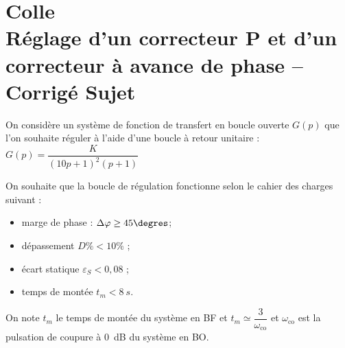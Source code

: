 \chapter*{Colle  \\ 
Réglage d'un correcteur P et d'un correcteur à avance de phase -- 
\ifprof Corrigé \else Sujet \fi}

\iflivret {} \else
\ifprof  {} \else \fi
\fi

\setcounter{question}{0}




On considère un système de fonction de transfert en boucle ouverte $G(p)$ que l'on souhaite réguler à l’aide d'une boucle à retour unitaire : $G(p)=\dfrac{K}{\left(10p+1 \right)^2\left(p+1 \right)}$

On souhaite que la boucle de régulation fonctionne selon le cahier des charges suivant :
\begin{itemize}
\item marge de phase : $\Delta \varphi \geq 45\degres$;
\item dépassement $D\% < 10\%$ ; 
\item écart statique $\varepsilon_S < 0,08$ ; 
\item temps de montée $t_m < \SI{8}{s}$.
\end{itemize}



On note $t_m$ le temps de montée du système en BF et $t_m\simeq \dfrac{3}{\omega_{\text{co}}}$ et $\omega_{\text{co}}$ est la pulsation de coupure à \SI{0}{dB} du système en BO.  

